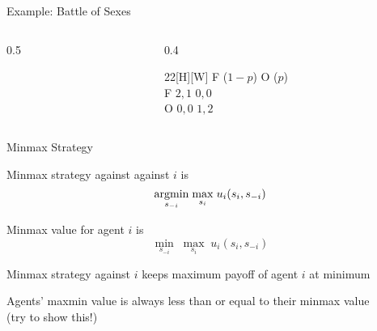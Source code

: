 \documentclass[11pt,aspectratio=169]{beamer}
\begin{document}
\begin{frame}{Example: Battle of Sexes}
\begin{columns}
\begin{column}{0.5\textwidth}
\begin{center}
\begin{tikzpicture}
      \end{tikzpicture}
     \end{center}
    \end{column}   
    \begin{column}{0.4\textwidth}
     \hspace{-20pt}
     \vspace{-30pt}
     \begin{center}
      \begin{game}{2}{2}[H][W]
    		\> F ($1-p$)	\> O	 ($p$)\\
       F	\> $2,1$		\> $0,0$	\\
       O	\> $0,0$		\> $1,2$
      \end{game}
     \end{center}
    \end{column}
   \end{columns}
  \end{frame}

  \begin{frame}{Minmax Strategy}
   \begin{itemizes}
    \item \alert{Minmax strategy} against against $i$ is 
    $$\underset{s_{-i}}{\argmin} \; \underset{s_{i}}{\max} \; u_{i}(s_i,s_{-i})$$
    \item Minmax value for agent $i$ is 
    $$\underset{s_{-i}}{\min} \; \underset{s_{i}}{\max} \; u_{i}(s_i,s_{-i})$$
    \item Minmax strategy against $i$ keeps maximum payoff of agent $i$ at minimum    
    \item Agents' maxmin value is always less than or equal to their minmax value\\(try to show this!)
   \end{itemizes}
  \end{frame}
  
\end{document}
